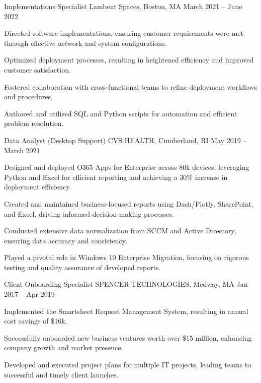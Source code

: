 \begin{cventries}

\cventry
{Implementations Specialist} %
{Lambent Spaces, Boston, MA} %
{} %
{March 2021 – June 2022} %
{ %
\begin{cvitems}
\item {Directed software implementations, ensuring customer requirements were met through effective network and system configurations.}
\item {Optimized deployment processes, resulting in heightened efficiency and improved customer satisfaction.}
\item {Fostered collaboration with cross-functional teams to refine deployment workflows and procedures.}
\item {Authored and utilized SQL and Python scripts for automation and efficient problem resolution.}
\end{cvitems}
}


\cventry
{Data Analyst (Desktop Support)} %
{CVS HEALTH, Cumberland, RI} %
{} %
{May 2019 – March 2021} %
{ %
\begin{cvitems}
\item {Designed and deployed O365 Apps for Enterprise across 80k devices, leveraging Python and Excel for efficient reporting and achieving a 30\% increase in deployment efficiency.}
\item {Created and maintained business-focused reports using Dash/Plotly, SharePoint, and Excel, driving informed decision-making processes.}
\item {Conducted extensive data normalization from SCCM and Active Directory, ensuring data accuracy and consistency.}
\item {Played a pivotal role in Windows 10 Enterprise Migration, focusing on rigorous testing and quality assurance of developed reports.}
\end{cvitems}
}


\cventry
{Client Onboarding Specialist} %
{SPENCER TECHNOLOGIES, Medway, MA} %
{} %
{Jan 2017 – Apr 2019} %
{ %
\begin{cvitems}
\item {Implemented the Smartsheet Request Management System, resulting in annual cost savings of \$16k.}
\item {Successfully onboarded new business ventures worth over \$15 million, enhancing company growth and market presence.}
\item {Developed and executed project plans for multiple IT projects, leading teams to successful and timely client launches.}
\end{cvitems}
}


\end{cventries}
